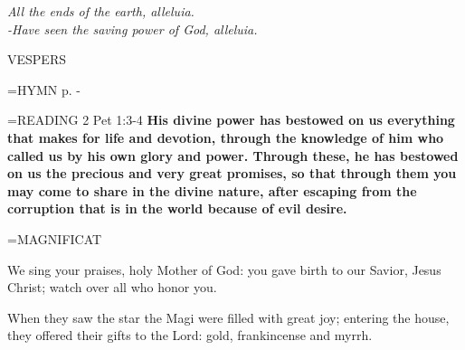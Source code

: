 \begin{center}
\textit{All the ends of the earth, alleluia.\\
-Have seen the saving power of God, alleluia.}
\end{center}

\begin{flushleft}\normalsize VESPERS\\\end{flushleft}

\hangindent=\parindent \small{\uppercase{HYMN} p.  \pageref{christmas:firstHymn} - \pageref{christmas:lastHymn}\\}

\hangindent=\parindent \small{READING}    2 Pet 1:3-4 \textbf{   His divine power has bestowed on us everything that makes for life and devotion, through the knowledge of him who called us by his own glory and power. Through these, he has bestowed on us the precious and very great promises, so that through them you may come to share in the divine nature, after escaping from the corruption that is in the world because of evil desire.\\}

\hangindent=\parindent \small MAGNIFICAT
\begin{description}[labelindent=\parindent, noitemsep, leftmargin=*]
\item [(before the Epiphany):]  We sing your praises, holy Mother of God: you gave birth to our Savior, Jesus Christ; watch over all who honor you.
\item [(Monday after the Epiphany):]  When they saw the star the Magi were filled with great joy; entering the house, they offered their gifts to the Lord: gold, frankincense and myrrh.
\end{description}
